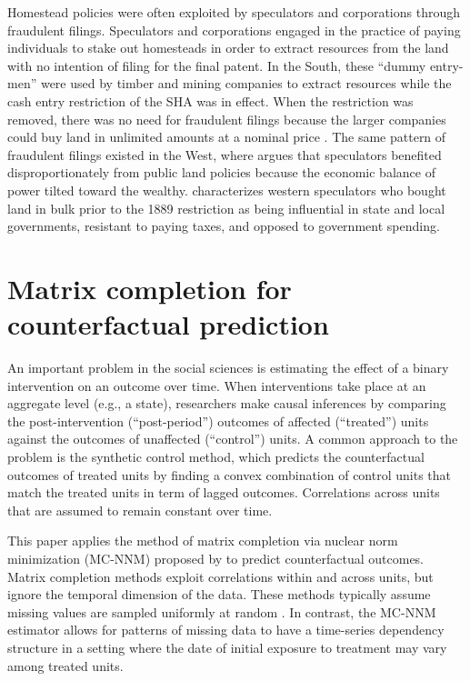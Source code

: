 \documentclass[hidelinks,12pt]{article}
\begin{document}
Homestead policies were often exploited by speculators and corporations through fraudulent filings. Speculators and corporations engaged in the practice of paying individuals to stake out homesteads in order to extract resources from the land with no intention of filing for the final patent. In the South, these ``dummy entry-men'' were used by timber and mining companies to extract resources while the cash entry restriction of the SHA was in effect. When the restriction was removed, there was no need for fraudulent filings because the larger companies could buy land in unlimited amounts at a nominal price \citep{gates1940federal, gates1979federal}. The same pattern of fraudulent filings existed in the West, where \citet{murtazashvili2013political} argues that speculators benefited disproportionately from public land policies because the economic balance of power tilted toward the wealthy. \citet{gates1942role} characterizes western speculators who bought land in bulk prior to the 1889 restriction as being influential in state and local governments, resistant to paying taxes, and opposed to government spending. 

\section{Matrix completion for counterfactual prediction} \label{estimation}

An important problem in the social sciences is estimating the effect of a binary intervention on an outcome over time. When interventions take place at an aggregate level (e.g., a state), researchers make causal inferences by comparing the post-intervention (``post-period'') outcomes of affected (``treated'') units against the outcomes of unaffected  (``control'') units. A common approach to the problem is the synthetic control method, which predicts the counterfactual outcomes of treated units by finding a convex combination of control units that match the treated units in term of lagged outcomes. Correlations across units that are assumed to remain constant over time. 

This paper applies the method of matrix completion via nuclear norm minimization (MC-NNM) proposed by \citet{athey2017matrix} to predict counterfactual outcomes. Matrix completion methods \citep[e.g.,][]{mazumder2010spectral} exploit correlations within and across units, but ignore the temporal dimension of the data. These methods typically assume missing values are sampled uniformly at random \citep{yoon2018estimating}. In contrast, the MC-NNM estimator allows for patterns of missing data to have a time-series dependency structure in a setting where the date of initial exposure to treatment may vary among treated units.
\end{document}

